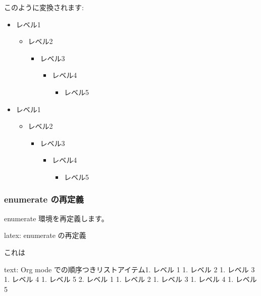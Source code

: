 \documentclass[dvipdfmx,a4j,14pt,uplatex]{jsarticle}
\begin{document}
このように変換されます:

\begin{itemize}
\item レベル1
\begin{itemize}
\item レベル2
\begin{itemize}
\item レベル3
\begin{itemize}
\item レベル4
\begin{itemize}
\item レベル5
\end{itemize}
\end{itemize}
\end{itemize}
\end{itemize}
\item レベル1
\begin{itemize}
\item レベル2
\begin{itemize}
\item レベル3
\begin{itemize}
\item レベル4
\begin{itemize}
\item レベル5
\end{itemize}
\end{itemize}
\end{itemize}
\end{itemize}
\end{itemize}

\subsubsection{enumerate の再定義}
\label{sec:org0814a64}
enumerate 環境を再定義します。

\begin{programlist}[label={org6320190}]{latex}{: enumerate の再定義}
\end{programlist}

これは

\begin{programlist}[label={org90d6b07}]{text}{: Org mode での順序つきリストアイテム}1. レベル 1
   1. レベル 2
      1. レベル 3
         1. レベル 4
            1. レベル 5
2. レベル 1
   1. レベル 2
      1. レベル 3
         1. レベル 4
            1. レベル 5
\end{programlist}
\end{document}
